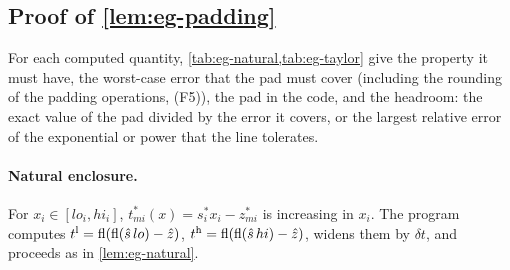 \subsection{Proof of \texorpdfstring{\cref{lem:eg-padding}}{the padding lemma}}\label{app:egrounding-proof}

For each computed quantity, \cref{tab:eg-natural,tab:eg-taylor} give the property it must have, the worst-case error that the pad must cover (including the rounding of the padding operations, (F5)), the pad in the code, and the headroom: the exact value of the pad divided by the error it covers, or the largest relative error of the exponential or power that the line tolerates.

\providecommand{\egcell}[1]{\scriptsize\raggedright\let\\\tabularnewline #1}

\paragraph{Natural enclosure.}
For $x_i\in[lo_i,hi_i]$, $t^*_{mi}(x)=s^*_ix_i-z^*_{mi}$ is increasing in $x_i$.
The program computes $t^{\mathrm{l}}=\operatorname{fl}(\operatorname{fl}(\hat s\,lo)-\hat z)$, $t^{\mathrm{h}}=\operatorname{fl}(\operatorname{fl}(\hat s\,hi)-\hat z)$, widens them by $\delta t$, and proceeds as in \cref{lem:eg-natural}.


